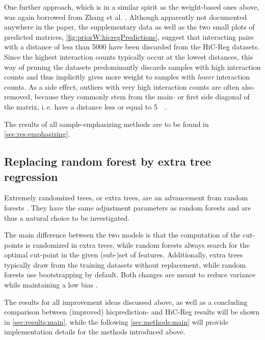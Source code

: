 One further approach, which is in a similar spirit as the weight-based ones above,
was again borrowed from Zhang et al. \cite{Zhang2019}. 
Although apparently not documented anywhere in the paper,
the supplementary data as well as the two small plots of predicted matrices, 
\autoref{fig:priorW:hicregPredictions},
suggest that interacting pairs with a distance of less than \SI{5000}{\bp} have been discarded
from the HiC-Reg datasets. 
Since the highest interaction counts typically occur at the lowest distances,
this way of pruning the datasets predominantly discards samples with high interaction counts
and thus implicitly gives more weight to samples with \emph{lower} interaction counts.
As a side effect, outliers with very high interaction counts are often also removed,
because they commonly stem from the main- or first side diagonal of the matrix, i.\,e. have a distance less or equal to \SI{5}{\kilo\bp}.

The results of all sample-emphasizing methods are to be found in \autoref{sec:res:emphasizing}.

\subsection{Replacing random forest by extra tree regression}
Extremely randomized trees, or extra trees, are an advancement from random forests \cite{Geurts2006}.
They have the same adjustment parameters as random forests and are thus a natural choice to be investigated.

The main difference between the two models is that the computation of the cut-points is randomized in extra trees,
while random forests always search for the optimal cut-point in the given (sub-)set of features.
Additionally, extra trees typically draw from the training datasets without replacement,
while random forests use bootstrapping by default.
Both changes are meant to reduce variance while maintaining a low bias \cite{Geurts2006}.

The results for all improvement ideas discussed above, as well as a concluding comparison between
(improved) hicprediction- and HiC-Reg results will be shown in \autoref{sec:results:main},
while the following \autoref{sec:methods:main} will provide implementation details for the methods introduced above.


